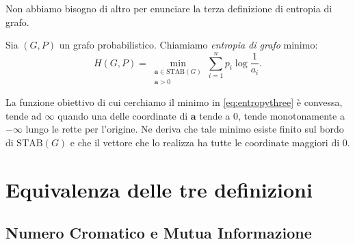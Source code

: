 Non abbiamo bisogno di altro per enunciare la terza definizione di entropia di grafo. 
\begin{definition}
	Sia \((G,P)\) un grafo probabilistico. Chiamiamo \emph{entropia di grafo} minimo: 
	\begin{equation}
		\label{eq:entropythree} H(G,P)=\min_{\substack{\mathbf{a}\in \text{STAB}(G) \\
		\mathbf{a} > 0}} \sum_{i=1}^n p_i \log{\frac{1}{a_i}}. 
	\end{equation}
\end{definition}
\begin{remark}
	La funzione obiettivo di cui cerchiamo il minimo in \eqref{eq:entropythree} è convessa, tende ad \(\infty\) quando una delle coordinate di \(\mathbf{a}\) tende a \(0\), tende monotonamente a \(-\infty\) lungo le rette per l'origine. Ne deriva che tale minimo esiste finito sul bordo di \(\text{STAB}(G)\) e che il vettore che lo realizza ha tutte le coordinate maggiori di \(0\). 
\end{remark}

\section{Equivalenza delle tre definizioni}

\subsection{Numero Cromatico e Mutua Informazione}

